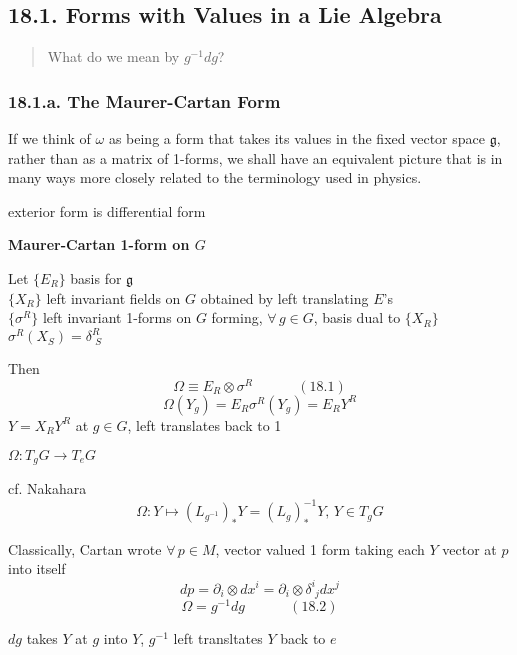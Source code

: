 
\subsection{ 18.1. Forms with Values in a Lie Algebra}

\begin{quote}
  What do we mean by $g^{-1} dg$?
\end{quote}

\subsubsection{ 18.1.a. The Maurer-Cartan Form }

If we think of $\omega$ as being a form that takes its values in the fixed vector space $\mathfrak{g}$, rather than as a matrix of 1-forms, we shall have an equivalent picture that is in many ways more closely related to the terminology used in physics.  

exterior form is differential form

\textbf{ Maurer-Cartan 1-form on $G$}

Let $\lbrace E_R \rbrace$ basis for $\mathfrak{g}$  \\
\phantom{Let} $\lbrace X_R \rbrace$ left invariant fields on $G$ obtained by left translating $E$'s  \\ 
\phantom{Let} $\lbrace \sigma^R \rbrace$ left invariant 1-forms on $G$ forming, $\forall \, g \in G$, basis dual to $\lbrace X_R \rbrace$  \\

$\sigma^R(X_S) = \delta^R_{ \, \, S}$

Then 
\begin{equation}
  \Omega \equiv E_R \otimes \sigma^R \quad \quad \quad \, (18.1)
\end{equation} 
\[
\Omega(Y_g) = E_R \sigma^R(Y_g) = E_R Y^R 
\]
$Y = X_R Y^R$ at $g\in G$, left translates back to 1

$\Omega : T_gG \to T_e G$

cf. Nakahara
\[
\Omega : Y \mapsto (L_{g^{-1}})_* Y = (L_g)^{-1}_* Y, \, Y \in T_g G
\]

Classically, Cartan wrote $\forall \, p \in M$, vector valued 1 form taking each $Y$ vector at $p$ into itself
\[
dp = \partial_i \otimes dx^i = \partial_i \otimes \delta^i_{ \, \, j }dx^j
\]
\begin{equation}
  \Omega = g^{-1} dg \quad \quad \quad \, (18.2)
\end{equation}

$dg$ takes $Y$ at $g$ into $Y$, $g^{-1}$ left transltates $Y$ back to $e$


